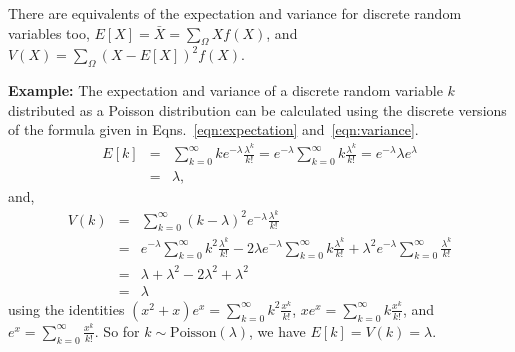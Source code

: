 There are equivalents of the expectation and variance for discrete random variables too, $E[X]=\bar{X}=\sum_{\Omega}Xf(X)$, and $V(X)=\sum_\Omega (X-E[X])^2f(X)$.
\begin{tcolorbox}[colback = backblue]
\textbf{Example:} The expectation and variance of a discrete random variable $k$ distributed as a Poisson distribution can be calculated using the discrete versions of the formula given in Eqns.~\ref{eqn:expectation} and~\ref{eqn:variance}.
\begin{eqnarray}
E[k] & = & \sum_{k=0}^{\infty}ke^{-\lambda}\frac{\lambda^{k}}{k!}
      =  e^{-\lambda}\sum_{k=0}^{\infty}k\frac{\lambda^{k}}{k!}
      =  e^{-\lambda}\lambda e^{\lambda} \\
      & = & \lambda,
\end{eqnarray}
and,
\begin{eqnarray}
V(k) & = & \sum_{k=0}^{\infty}(k-\lambda)^2 e^{-\lambda}\frac{\lambda^{k}}{k!} \\
      & = & e^{-\lambda}\sum_{k=0}^{\infty}k^{2}\frac{\lambda^{k}}{k!}
      -2\lambda e^{-\lambda}\sum_{k=0}^{\infty}k\frac{\lambda^{k}}{k!}
      + \lambda^{2} e^{-\lambda}\sum_{k=0}^{\infty}\frac{\lambda^{k}}{k!} \\
      & = & \lambda+\lambda^{2} - 2\lambda^{2}+\lambda^{2} \\
      & = & \lambda
\end{eqnarray}
using the identities $(x^2+x)e^{x}=\sum_{k=0}^{\infty}k^{2}\frac{x^{k}}{k!}$, $xe^{x}=\sum_{k=0}^{\infty}k\frac{x^{k}}{k!}$, and $e^{x}=\sum_{k=0}^{\infty}\frac{x^{k}}{k!}$. So for $k\sim\mathrm{Poisson}(\lambda)$, we have $E[k]=V(k)=\lambda$.  
\end{tcolorbox}

